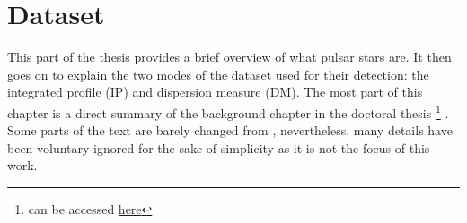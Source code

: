 \chapter{Dataset}\label{chapter-dataset} 

This part of the thesis provides a brief overview of what pulsar stars are. It then goes on to explain the two modes of the dataset used for their detection: the integrated profile (IP) and dispersion measure (DM). The most part of this chapter is a direct summary of the background chapter in the doctoral thesis \citep{lyon}\footnote{\citep{lyon} can be accessed \href{http://www.scienceguyrob.com/wp-content/uploads/2016/12/WhyArePulsarsHardToFind_Lyon_2016.pdf}{here}} . Some parts of the text are barely changed from \citep{lyon}, nevertheless, many details have been voluntary ignored for the sake of simplicity as it is not the focus of this work. 

